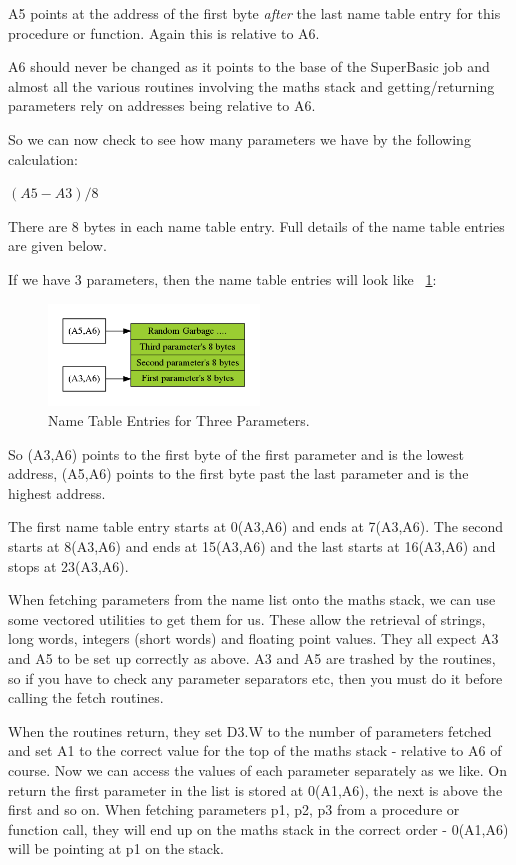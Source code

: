 A5 points at the address of the first byte \emph{after} the last name table
    entry for this procedure or function. Again this is relative to A6.

A6 should never be changed as it points to the base of the
    SuperBasic job and almost all the various routines involving the maths
    stack and getting/returning parameters rely on addresses being relative to
    A6.

So we can now check to see how many parameters we have by the
    following calculation:

$(A5-A3)/8$

There are 8 bytes in each name table entry. Full details of the name
    table entries are given below.

If we have 3 parameters, then the name table entries will look like
     \figurename~\ref{fig:NameTableEntriesForThreeParameters}:

\begin{figure}[h]
\center
\includegraphics[width=0.5\textwidth]{Content/images/Name_Table_Entries.png}
\caption{Name Table Entries for Three Parameters.}
\label{fig:NameTableEntriesForThreeParameters}
\end{figure}

So (A3,A6) points to the first byte of the first parameter and is
    the lowest address, (A5,A6) points to the first byte past the last
    parameter and is the highest address.

The first name table entry starts at 0(A3,A6) and ends at 7(A3,A6).
    The second starts at 8(A3,A6) and ends at 15(A3,A6) and the last starts at
    16(A3,A6) and stops at 23(A3,A6).

When fetching parameters from the name list onto the maths stack, we
    can use some vectored utilities to get them for us. These allow the
    retrieval of strings, long words, integers (short words) and floating
    point values. They all expect A3 and A5 to be set up correctly as above.
    A3 and A5 are trashed by the routines, so if you have to check any
    parameter separators etc, then you must do it before calling the fetch
    routines.

When the routines return, they set D3.W to the number of parameters
    fetched and set A1 to the correct value for the top of the maths stack -{}
    relative to A6 of course. Now we can access the values of each parameter
    separately as we like. On return the first parameter in the list is stored
    at 0(A1,A6), the next is above the first and so on. When fetching
    parameters p1, p2, p3 from a procedure or function call, they will end up
    on the maths stack in the correct order -{} 0(A1,A6) will be pointing at p1
    on the stack.


